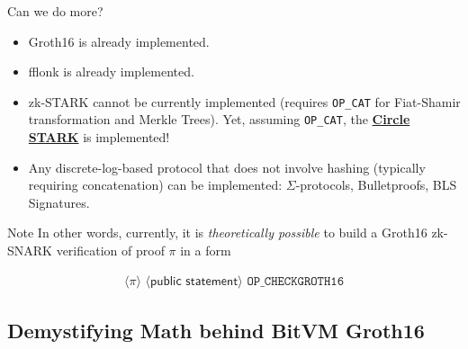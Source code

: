 \documentclass{zkdl-presentation-template}
\newcommand{\elem}[1]{\, \langle #1 \rangle \,}
\newcommand{\opcode}[1]{\, \texttt{#1} \,}
\newcommand{\cmark}{\textcolor{green!65!black}{\ding{51}}}%
\newcommand{\xmark}{\textcolor{red!80!black}{\ding{55}}}%
\begin{document}
    \begin{frame}{Can we do more?}
        \begin{itemize}[label={}]
            \item \cmark \hspace{1px} Groth16 is already implemented.\pause
            \item \cmark \hspace{1px} \textsf{fflonk} is already implemented.\pause
            \item \xmark \hspace{1px} zk-STARK cannot be currently implemented (requires \texttt{OP\_CAT} for Fiat-Shamir transformation and Merkle Trees). Yet, assuming \texttt{OP\_CAT}, the \href{https://eprint.iacr.org/2024/278}{\textcolor{blue!70!white}{\textbf{Circle STARK}}} is implemented!\pause
            \item \cmark \hspace{1px} Any discrete-log-based protocol that does not involve hashing (typically requiring concatenation) can be implemented: $\Sigma$-protocols, Bulletproofs, BLS Signatures.\pause
        \end{itemize}

        \begin{block}{Note}
            In other words, currently, it is \textit{theoretically possible} to build a Groth16 zk-SNARK verification of proof $\pi$ in a form
            \begin{empheqboxed}
            \small
            \begin{align*}
                \elem{\pi} \elem{\textsf{public statement}} \opcode{OP\_CHECKGROTH16}
            \end{align*}
          \end{empheqboxed}
        \end{block}
    \end{frame}

    \subsection{Demystifying Math behind BitVM Groth16}
    
\end{document}
